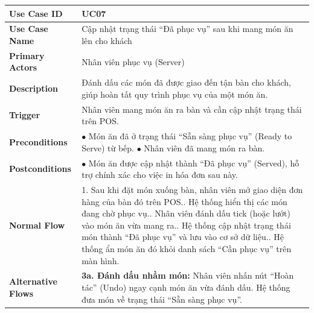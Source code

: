 \begin{longtable}{|L{3.5cm}|L{12.5cm}|}
\hline
\textbf{Use Case ID} & UC07 \\ \hline
\textbf{Use Case Name} & Cập nhật trạng thái ``Đã phục vụ'' sau khi mang món ăn lên cho khách \\ \hline
\textbf{Primary Actors} & Nhân viên phục vụ (Server) \\ \hline
\textbf{Description} & Đánh dấu các món đã được giao đến tận bàn cho khách, giúp hoàn tất quy trình phục vụ của một món ăn. \\ \hline
\textbf{Trigger} & Nhân viên mang món ăn ra bàn và cần cập nhật trạng thái trên POS. \\ \hline
\textbf{Preconditions} &
$\bullet$ Món ăn đã ở trạng thái ``Sẵn sàng phục vụ'' (Ready to Serve) từ bếp.\newline
$\bullet$ Nhân viên đã mang món ra bàn. \\ \hline
\textbf{Postconditions} & $\bullet$ Món ăn được cập nhật thành ``Đã phục vụ'' (Served), hỗ trợ chính xác cho việc in hóa đơn sau này. \\ \hline
\textbf{Normal Flow} &
1. Sau khi đặt món xuống bàn, nhân viên mở giao diện đơn hàng của bàn đó trên POS.. Hệ thống hiển thị các món đang chờ phục vụ.. Nhân viên đánh dấu tick (hoặc lướt) vào món ăn vừa mang ra.. Hệ thống cập nhật trạng thái món thành ``Đã phục vụ'' và lưu vào cơ sở dữ liệu.. Hệ thống ẩn món ăn đó khỏi danh sách ``Cần phục vụ'' trên màn hình. \\ \hline
\textbf{Alternative Flows} &
\textbf{3a. Đánh dấu nhầm món:} Nhân viên nhấn nút ``Hoàn tác'' (Undo) ngay cạnh món ăn vừa đánh dấu. Hệ thống đưa món về trạng thái ``Sẵn sàng phục vụ''. \\ \hline
\end{longtable}

